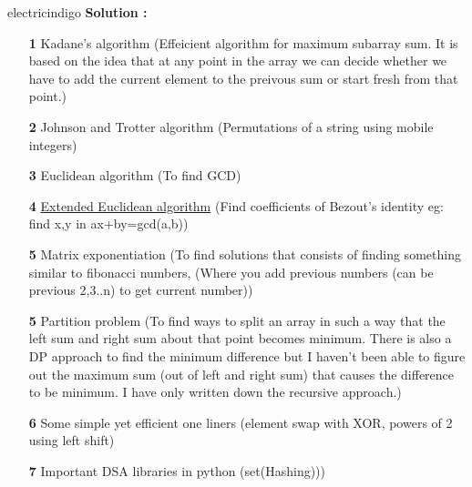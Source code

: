 \documentclass[12pt]{article}
\begin{document}
\begin{mybox}{electricindigo}{}
	\textbf{Solution :} 
	\begin{itemize}
		\item[\textbf{1}] Kadane's algorithm (Effeicient algorithm for maximum subarray sum. It is based on the idea that at any point in the array we can decide whether we have to add the current element to the preivous sum or start fresh from that point.)
		\item[\textbf{2}] Johnson and Trotter algorithm (Permutations of a string using mobile integers)
		\item[\textbf{3}] Euclidean algorithm (To find GCD) 
		\item[\textbf{4}] \href{https://en.wikipedia.org/wiki/Extended_Euclidean_algorithm}{Extended Euclidean algorithm} (Find coefficients of Bezout's identity eg: find x,y in ax+by=gcd(a,b))
		\item[\textbf{5}] Matrix exponentiation (To find solutions that consists of finding something similar to fibonacci numbers, (Where you add previous numbers (can be previous 2,3..n) to get current number))
		\item[\textbf{5}] Partition problem (To find ways to split an array in such a way that the left sum and right sum about that point becomes minimum. There is also a DP approach to find the minimum difference but I haven't been able to figure out the maximum sum (out of left and right sum) that causes the difference to be minimum. I have only written down the recursive approach.)
		\item[\textbf{6}] Some simple yet efficient one liners (element swap with XOR, powers of 2 using left shift)
		\item[\textbf{7}] Important DSA libraries in python (set(Hashing)))
		
		
		
	\end{itemize}
	

\end{mybox}
\end{document}
